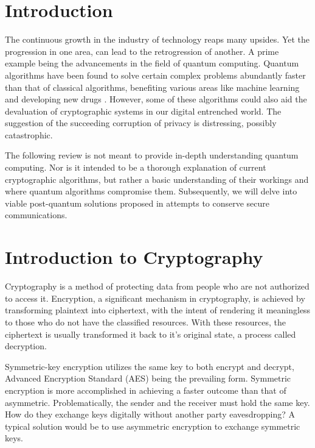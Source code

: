 \section{Introduction}
The continuous growth in the industry of technology reaps many upsides. 
Yet the progression in one area, can lead to the retrogression of another.
A prime example being the advancements in the field of quantum computing.
Quantum algorithms have been found to solve certain complex problems abundantly faster than that of classical algorithms, benefiting various areas like machine learning \cite{Sec_Risk} and developing new drugs \cite{Q_Comp_Real}. 
However, some of these algorithms could also aid the devaluation of cryptographic systems in our digital entrenched world. The suggestion of the succeeding corruption of privacy is distressing, possibly catastrophic. 



The following review is not meant to provide in-depth understanding quantum computing. Nor is it intended to be a thorough explanation of current cryptographic algorithms, but rather a basic understanding of their workings and where quantum algorithms compromise them.
Subsequently, we will delve into viable post-quantum solutions proposed in attempts to conserve secure communications.

\section{Introduction to Cryptography}
Cryptography is a method of protecting data from people who are not authorized to access it. Encryption, a significant mechanism in cryptography, is achieved by transforming plaintext into ciphertext, with the intent of rendering it meaningless to those who do not have the classified resources. With these resources, the ciphertext is usually transformed it back to it's original state, a process called decryption.

Symmetric-key encryption utilizes the same key to both encrypt and decrypt, Advanced Encryption Standard (AES) being the prevailing form. Symmetric encryption is more accomplished in achieving a faster outcome than that of asymmetric. Problematically, the sender and the receiver must hold the same key. How do they exchange keys digitally without another party eavesdropping? A typical solution would be to use asymmetric encryption to exchange symmetric keys.

